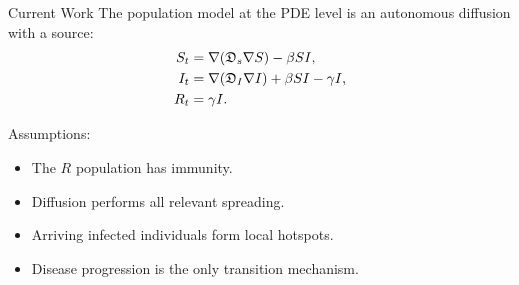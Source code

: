 \begin{slide}{Current Work}
	The population model at the PDE level is an autonomous diffusion with a source:
	\begin{align*}
	S_t	&=	\nabla (\mathfrak{D}_s \nabla S) - \beta SI,	\\
	I_t	&=	\nabla (\mathfrak{D}_I \nabla I) + \beta SI - \gamma I,	\\
	R_t	&=	\gamma I.
	\end{align*}
	
	\vspace{.5cm}
	Assumptions:
	\begin{itemize}
		\item The $R$ population has immunity.
		\item Diffusion performs all relevant spreading.
		\item Arriving infected individuals form local hotspots.
		\item Disease progression is the only transition mechanism.
	\end{itemize}
	
\end{slide}